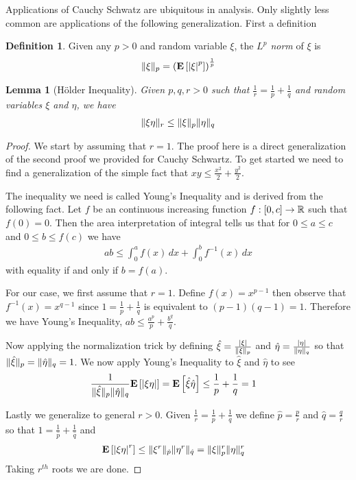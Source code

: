 \documentclass{amsart}
\newtheorem{lem}[thm]{Lemma}
\theoremstyle{remark}
\theoremstyle{definition}
\newtheorem{defn}[thm]{Definition}
\begin{document}
Applications of Cauchy Schwatz are ubiquitous in analysis.  Only
slightly less common are applications of the following
generalization.  First a definition
\begin{defn}Given any $p > 0$ and random variable $\xi$, the \emph{$L^p$
  norm} of $\xi$ is 
\begin{align*}
\lVert \xi \rVert_p = \left (\textbf{E}\left[\left \vert \xi \right \vert^p\right] \right )^ {\frac{1}{p}}
\end{align*}
\end{defn}
\begin{lem}[H\"{o}lder Inequality]\label{Holder}Given $p,q,r > 0$ such
  that $\frac{1}{r} = \frac{1}{p} + \frac{1}{q}$ and random variables
  $\xi$ and $\eta$, we have
\begin{align*}
\lVert \xi \eta \rVert_r \leq \lVert \xi  \rVert_p \lVert \eta \rVert_q
\end{align*}
\end{lem}
\begin{proof}
We start by assuming that $r=1$.  The proof here is a direct generalization of the second proof we
provided for Cauchy Schwartz.  To get started we need to find a
generalization of the simple fact that $xy \leq \frac{x^2}{2} +
\frac{y^2}{2}$.  
 
The inequality we need is called Young's Inequality and is derived
from the following fact.  Let $f$ be an
continuous increasing function $f : [0,c] \to \mathbb{R}$ such that $f(0)
= 0$.  Then the area interpretation of integral tells us that for $0
\leq a \leq c$ and $0 \leq b \leq f(c)$ we have
\begin{align*}
ab \leq \int_0^a f(x) \, dx + \int_0^b f^{-1}(x) \, dx
\end{align*}
with equality if and only if $b=f(a)$.  

For our case, we first assume that $r = 1$.  Define $f(x) =
x^{p-1}$ then observe that $f^{-1}(x) = x^{q-1}$ since
$1 = \frac{1}{p} + \frac{1}{q}$ is equivalent to $(p-1)(q-1) = 1$.
Therefore we have Young's Inequality, $ab \leq \frac{a^p}{p} +
\frac{b^q}{q}$.

Now applying the normalization trick by defining $\hat{\xi} =
\frac{\left \vert \xi \right \vert}{\lVert \xi \rVert_p}$ and $\hat{\eta} =
\frac{\left \vert \eta \right \vert}{\lVert \eta \rVert_q}$ so that ${\lVert \hat{\xi} \rVert_p} =
{\lVert \hat{\eta} \rVert_q} = 1$.  We now apply Young's Inequality to
$\hat{\xi}$ and $\hat{\eta}$ to see
\begin{align*}
\frac{1}{\lVert \hat{\xi} \rVert_p \lVert \hat{\eta} \rVert_q} \textbf{E}\left[\left \vert \xi \eta \right \vert\right] &=
\textbf{E}\left[\hat{\xi}\hat{\eta}\right] \leq \frac{1}{p} + \frac{1}{q} = 1
\end{align*}

Lastly we generalize to general $r>0$.  Given $\frac{1}{r} =
\frac{1}{p} + \frac{1}{q}$ we define $\hat{p} = \frac{p}{r}$ and 
$\hat{q} = \frac{q}{r}$ so that $1 =
\frac{1}{\hat{p}} + \frac{1}{\hat{q}}$ and 
\begin{align*}
\textbf{E}\left[\left \vert \xi \eta \right \vert^r\right] &\leq \lVert \xi^r \rVert_{\hat{p}}
\lVert \eta^r \rVert_{\hat{q}} = \lVert \xi \rVert_p^r \lVert \eta \rVert_q^r 
\end{align*}
Taking $r^{th}$ roots we are done.
\end{proof}
\end{document}
